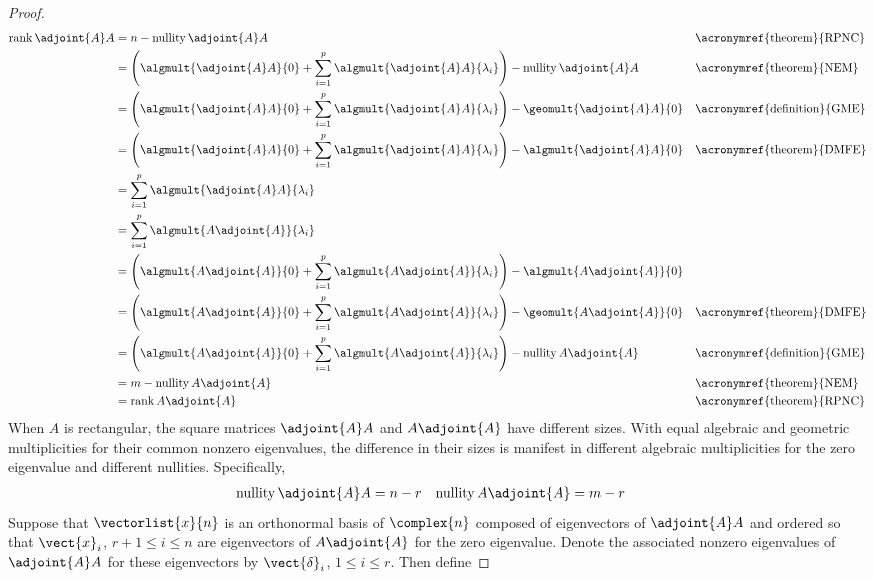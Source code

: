 \begin{proof}
%
\begin{align*}
\rank{\adjoint{A}A}
&=n-\nullity{\adjoint{A}A}&&\text{\acronymref{theorem}{RPNC}}\\
%
&=\left(\algmult{\adjoint{A}A}{0} + \sum_{i=1}^{p}\algmult{\adjoint{A}A}{\lambda_i}\right)-\nullity{\adjoint{A}A}
&&\text{\acronymref{theorem}{NEM}}\\
%
&=\left(\algmult{\adjoint{A}A}{0} + \sum_{i=1}^{p}\algmult{\adjoint{A}A}{\lambda_i}\right)-\geomult{\adjoint{A}A}{0}
&&\text{\acronymref{definition}{GME}}\\
%
&=\left(\algmult{\adjoint{A}A}{0} + \sum_{i=1}^{p}\algmult{\adjoint{A}A}{\lambda_i}\right)-\algmult{\adjoint{A}A}{0}
&&\text{\acronymref{theorem}{DMFE}}\\
%
&=\sum_{i=1}^{p}\algmult{\adjoint{A}A}{\lambda_i}\\
%
&=\sum_{i=1}^{p}\algmult{A\adjoint{A}}{\lambda_i}\\
%
&=\left(\algmult{A\adjoint{A}}{0} + \sum_{i=1}^{p}\algmult{A\adjoint{A}}{\lambda_i}\right)-\algmult{A\adjoint{A}}{0}\\
%
&=\left(\algmult{A\adjoint{A}}{0} + \sum_{i=1}^{p}\algmult{A\adjoint{A}}{\lambda_i}\right)-\geomult{A\adjoint{A}}{0}
&&\text{\acronymref{theorem}{DMFE}}\\
%
&=\left(\algmult{A\adjoint{A}}{0} + \sum_{i=1}^{p}\algmult{A\adjoint{A}}{\lambda_i}\right)-\nullity{A\adjoint{A}}
&&\text{\acronymref{definition}{GME}}\\
%
&=m-\nullity{A\adjoint{A}}&&\text{\acronymref{theorem}{NEM}}\\
%
&=\rank{A\adjoint{A}}&&\text{\acronymref{theorem}{RPNC}}
%
\end{align*}
%
When $A$ is rectangular, the square matrices $\adjoint{A}A$ and $A\adjoint{A}$ have different sizes.  With equal algebraic and geometric multiplicities for their common nonzero eigenvalues, the difference in their sizes is manifest in different algebraic multiplicities for the zero eigenvalue and different nullities.  Specifically,
%
\begin{align*}
\nullity{\adjoint{A}A}&=n-r
&
\nullity{A\adjoint{A}}&=m-r
\end{align*}
%
Suppose that $\vectorlist{x}{n}$ is an orthonormal basis of $\complex{n}$ composed of eigenvectors of $\adjoint{A}A$ and ordered so that $\vect{x}_i$, $r+1\leq i\leq n$ are eigenvectors of $A\adjoint{A}$ for the zero eigenvalue.  Denote the associated nonzero eigenvalues of $\adjoint{A}A$ for these eigenvectors by $\vect{\delta}_i$, $1\leq i\leq r$.   Then define

\end{proof}
